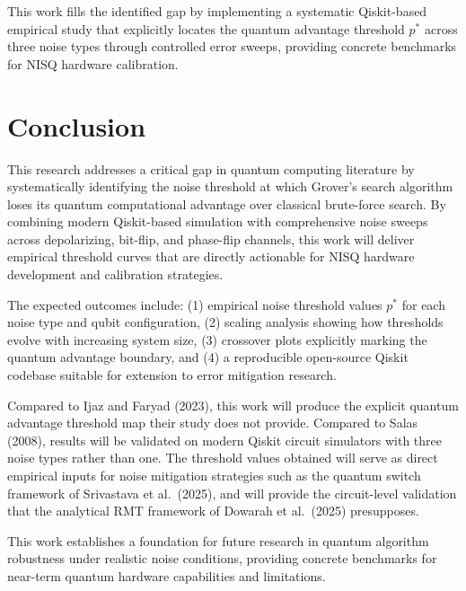 \documentclass[conference]{IEEEtran}
\begin{document}
This work fills the identified gap by implementing a systematic Qiskit-based
empirical study that explicitly locates the quantum advantage threshold $p^{*}$
across three noise types through controlled error sweeps, providing concrete
benchmarks for NISQ hardware calibration.

\section{Conclusion}

This research addresses a critical gap in quantum computing literature by
systematically identifying the noise threshold at which Grover's search algorithm
loses its quantum computational advantage over classical brute-force search. By
combining modern Qiskit-based simulation with comprehensive noise sweeps across
depolarizing, bit-flip, and phase-flip channels, this work will deliver empirical
threshold curves that are directly actionable for NISQ hardware development and
calibration strategies.

The expected outcomes include: (1) empirical noise threshold values $p^{*}$ for
each noise type and qubit configuration, (2) scaling analysis showing how
thresholds evolve with increasing system size, (3) crossover plots explicitly
marking the quantum advantage boundary, and (4) a reproducible open-source Qiskit
codebase suitable for extension to error mitigation research.

Compared to Ijaz and Faryad (2023), this work will produce the explicit quantum
advantage threshold map their study does not provide. Compared to Salas (2008),
results will be validated on modern Qiskit circuit simulators with three noise
types rather than one. The threshold values obtained will serve as direct empirical
inputs for noise mitigation strategies such as the quantum switch framework of
Srivastava et al.\ (2025), and will provide the circuit-level validation that the
analytical RMT framework of Dowarah et al.\ (2025) presupposes.

This work establishes a foundation for future research in quantum algorithm
robustness under realistic noise conditions, providing concrete benchmarks for
near-term quantum hardware capabilities and limitations.
\end{document}
